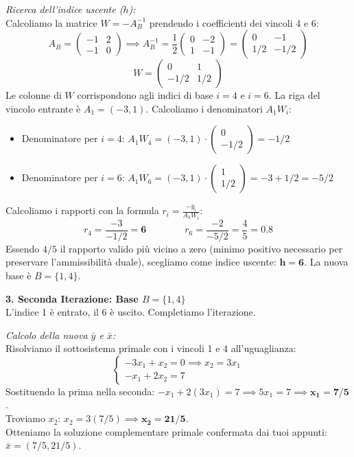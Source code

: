 \documentclass[12pt, a4paper]{article}
\newcommand{\separatore}{\noindent{\color{titlecolor!50}\rule{\textwidth}{0.6pt}}}
\begin{document}
	\textit{Ricerca dell'indice uscente ($h$):}\\
	Calcoliamo la matrice $W = -A_B^{-1}$ prendendo i coefficienti dei vincoli 4 e 6:
	\[
	A_B = \begin{pmatrix} -1 & 2 \\ -1 & 0 \end{pmatrix} \implies A_B^{-1} = \frac{1}{2} \begin{pmatrix} 0 & -2 \\ 1 & -1 \end{pmatrix} = \begin{pmatrix} 0 & -1 \\ 1/2 & -1/2 \end{pmatrix}
	\]
	\[
	W = \begin{pmatrix} 0 & 1 \\ -1/2 & 1/2 \end{pmatrix}
	\]
	Le colonne di $W$ corrispondono agli indici di base $i=4$ e $i=6$. La riga del vincolo entrante è $A_1 = (-3, 1)$. Calcoliamo i denominatori $A_1 W_i$:
	\begin{itemize}[label=$\circ$, itemsep=2pt, leftmargin=1.5cm]
		\item Denominatore per $i=4$: $A_1 W_4 = (-3, 1) \cdot \begin{pmatrix} 0 \\ -1/2 \end{pmatrix} = -1/2$
		\item Denominatore per $i=6$: $A_1 W_6 = (-3, 1) \cdot \begin{pmatrix} 1 \\ 1/2 \end{pmatrix} = -3 + 1/2 = -5/2$
	\end{itemize}
	Calcoliamo i rapporti con la formula $r_i = \frac{-\bar{y}_i}{A_k W_i}$:
	\[
	r_4 = \frac{-3}{-1/2} = \mathbf{6} \qquad \qquad r_6 = \frac{-2}{-5/2} = \frac{4}{5} = \mathbf{0.8}
	\]
	Essendo $4/5$ il rapporto valido più vicino a zero (minimo positivo necessario per preservare l'ammissibilità duale), scegliamo come indice uscente: $\mathbf{h = 6}$.
	La nuova base è $B = \{1, 4\}$.
	
	\vspace{0.6cm}
	\separatore
	\vspace{0.4cm}
	
	\textbf{3. Seconda Iterazione: Base $B = \{1, 4\}$}\\
	L'indice 1 è entrato, il 6 è uscito. Completiamo l'iterazione.
	
	\textit{Calcolo della nuova $\bar{y}$ e $\bar{x}$:}\\
	Risolviamo il sottosistema primale con i vincoli 1 e 4 all'uguaglianza:
	\[
	\begin{cases}
		-3x_1 + x_2 = 0 \implies x_2 = 3x_1 \\
		-x_1 + 2x_2 = 7
	\end{cases}
	\]
	Sostituendo la prima nella seconda: $-x_1 + 2(3x_1) = 7 \implies 5x_1 = 7 \implies \mathbf{x_1 = 7/5}$.\\
	Troviamo $x_2$: $x_2 = 3(7/5) \implies \mathbf{x_2 = 21/5}$.\\
	Otteniamo la soluzione complementare primale confermata dai tuoi appunti: $\bar{x} = (7/5, 21/5)$.
	
\end{document}
